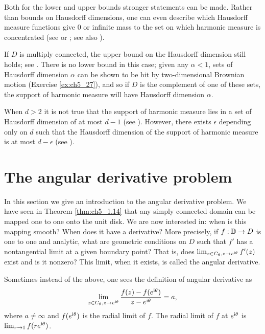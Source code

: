 Both for the lower and upper bounds stronger statements can be made. Rather than bounds on Hausdorff dimensions, one can even describe which Hausdorff measure functions give $0$ or infinite mass to the set on which harmonic measure is concentrated (see \cite{Makarov1985} or \cite{Pommerenke1992}; see also \cite{Wolff1993}).

If $D$ is multiply connected, the upper bound on the Hausdorff dimension still holds; see \cite{JonesWolff1988}. There is no lower bound in this case; given any $\alpha < 1$, sets of Hausdorff dimension $\alpha$ can be shown to be hit by two-dimensional Brownian motion (Exercise \ref{ex:ch5_27}), and so if $D$ is the complement of one of these sets, the support of harmonic measure will have Hausdorff dimension $\alpha$.

When $d > 2$ it is not true that the support of harmonic measure lies in a set of Hausdorff dimension of at most $d-1$ (see \cite{Wolff1987}). However, there exists $\epsilon$ depending only on $d$ such that the Hausdorff dimension of the support of harmonic measure is at most $d-\epsilon$ (see \cite{Bourgain1987}).

\section{The angular derivative problem}\label{ch5_sec5}


In this section we give an introduction to the angular derivative problem. We have seen in Theorem \ref{thm:ch5_1.14} that any simply connected domain can be mapped one to one onto the unit disk. We are now interested in: when is this mapping smooth? When does it have a derivative? More precisely, if $f : \mathbb{D} \to D$ is one to one and analytic, what are geometric conditions on $D$ such that $f'$ has a nontangential limit at a given boundary point? That is, does $\lim_{z\in C_\theta,z\to e^{\mathrm{i}\theta}} f'(z)$ exist and is it nonzero? This limit, when it exists, is called the angular derivative.

Sometimes instead of the above, one sees the definition of angular derivative as
\begin{equation}\label{eq:ch5_5.1}
    \lim_{z\in C_\theta,z\to e^{\mathrm{i}\theta}} \frac{f(z) - f(e^{\mathrm{i}\theta})}{z - e^{\mathrm{i}\theta}} = a,
\end{equation}
where $a \neq \infty$ and $f(e^{\mathrm{i}\theta})$ is the radial limit of $f$. The radial limit of $f$ at $e^{\mathrm{i}\theta}$ is $\lim_{r\to 1} f(re^{\mathrm{i}\theta})$.

